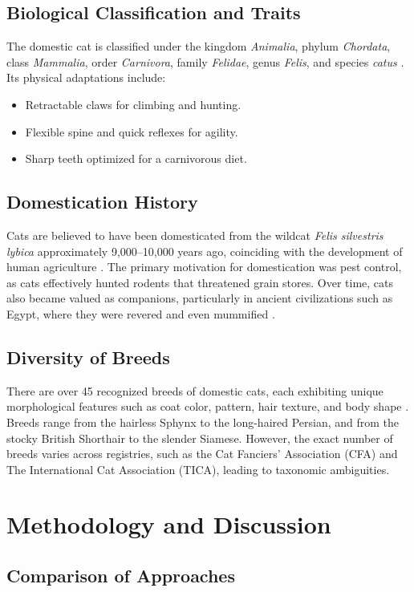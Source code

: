 \documentclass{article}
\begin{document}
\subsection{Biological Classification and Traits}
The domestic cat is classified under the kingdom \textit{Animalia}, phylum \textit{Chordata}, class \textit{Mammalia}, order \textit{Carnivora}, family \textit{Felidae}, genus \textit{Felis}, and species \textit{catus} \cite{key2}. Its physical adaptations include:
\begin{itemize}
    \item Retractable claws for climbing and hunting.
    \item Flexible spine and quick reflexes for agility.
    \item Sharp teeth optimized for a carnivorous diet.
\end{itemize}

\subsection{Domestication History}
Cats are believed to have been domesticated from the wildcat \textit{Felis silvestris lybica} approximately 9,000--10,000 years ago, coinciding with the development of human agriculture \cite{key3}. The primary motivation for domestication was pest control, as cats effectively hunted rodents that threatened grain stores. Over time, cats also became valued as companions, particularly in ancient civilizations such as Egypt, where they were revered and even mummified \cite{key4}.

\subsection{Diversity of Breeds}
There are over 45 recognized breeds of domestic cats, each exhibiting unique morphological features such as coat color, pattern, hair texture, and body shape \cite{key5}. Breeds range from the hairless Sphynx to the long-haired Persian, and from the stocky British Shorthair to the slender Siamese. However, the exact number of breeds varies across registries, such as the Cat Fanciers' Association (CFA) and The International Cat Association (TICA), leading to taxonomic ambiguities.

\section{Methodology and Discussion}
\subsection{Comparison of Approaches}
\end{document}
